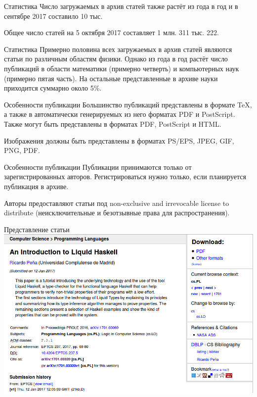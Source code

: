 \documentclass[14pt]{beamer}
\begin{document}
\begin{frame}{Статистика}
Число загружаемых в архив статей также растёт из года в год и в сентябре 2017 составило 10 тыс.

Общее число статей на 5 октября 2017 составляет 1 млн. 311 тыс. 222.
\end{frame}

\begin{frame}{Статистика}
Примерно половина всех загружаемых в архив статей являются статьи по различным областям физики. Однако из года в год растёт число публикаций в области математики (примерно четверть) и компьютерных наук (примерно пятая часть). На остальные представленные в архиве науки приходится суммарно около 5\%.
\end{frame}

\begin{frame}{Особенности публикации}
Большинство публикаций представлены в формате \TeX, а также в автоматически генерируемых из него форматах PDF и PostScript. Также могут быть представлены в форматах PDF, PostScript и HTML.

Изображения должны быть представлены в форматах PS/EPS, JPEG, GIF, PNG, PDF.
\end{frame}

\begin{frame}{Особенности публикации}
Публикации принимаются только от зарегистрированных авторов. Регистрироваться нужно только, если планируется публикация в архиве.

Авторы предоставляют статьи под non-exclusive and irrevocable license to distribute (неисключительные и безотзывные права для распространения).
\end{frame}

\begin{frame}{Представление статьи}
\includegraphics[width=\linewidth]{article_page}
\end{frame}
\end{document}
